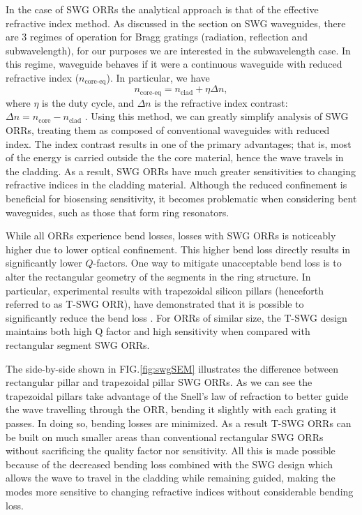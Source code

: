 \documentclass[aps,prl,twocolumn, superscriptaddress,nobalancelastpage]{revtex4}
\begin{document}
In the case of SWG ORRs the analytical approach is that of the effective refractive index method. As discussed in the section on SWG waveguides, there are 3 regimes of operation for Bragg gratings (radiation, reflection and subwavelength), for our purposes we are interested in the subwavelength case. In this regime, waveguide behaves if it were a continuous waveguide with reduced refractive index ($n_\text{core-eq}$). In particular, we have
\begin{equation}
    n_\text{core-eq} = n_\text{clad} + \eta \Delta n,
    \label{eq:n_eq}
\end{equation}
where $\eta$ is the duty cycle, and $\Delta n$ is the refractive index contrast:  $\Delta n = n_\text{core} - n_\text{clad}$ \cite{swg3}. Using this method, we can greatly simplify analysis of SWG ORRs, treating them as composed of conventional waveguides with reduced index. The index contrast results in one of the primary advantages; that is, most of the energy is carried outside the the core material, hence the wave travels in the cladding. As a result, SWG ORRs have much greater sensitivities to changing refractive indices in the cladding material. Although the reduced confinement is beneficial for biosensing sensitivity, it becomes problematic when considering bent waveguides, such as those that form ring resonators.

While all ORRs experience bend losses, losses with SWG ORRs is noticeably higher due to lower optical confinement. This higher bend loss directly results in significantly lower $Q$-factors. One way to mitigate unacceptable bend loss is to alter the rectangular geometry of the segments in the ring structure. In particular, experimental results with  trapezoidal silicon pillars (henceforth referred to as T-SWG ORR), have demonstrated that it is possible to significantly reduce the bend loss \cite{trapezoidal}. For ORRs of similar size, the T-SWG design maintains both high Q factor and high sensitivity when compared with rectangular segment SWG ORRs. 

The side-by-side shown in FIG.\ref{fig:swgSEM} illustrates the difference between rectangular pillar and trapezoidal pillar SWG ORRs. As we can see the trapezoidal pillars take advantage of the Snell's law of refraction to better guide the wave travelling through the ORR, bending it slightly with each grating it passes. In doing so, bending losses are minimized. As a result T-SWG ORRs can be built on much smaller areas than conventional rectangular SWG ORRs without sacrificing the quality factor nor sensitivity. All this is made possible because of the decreased bending loss combined with the SWG design which allows the wave to travel in the cladding while remaining guided, making the modes more sensitive to changing refractive indices without considerable bending loss.
\end{document}
